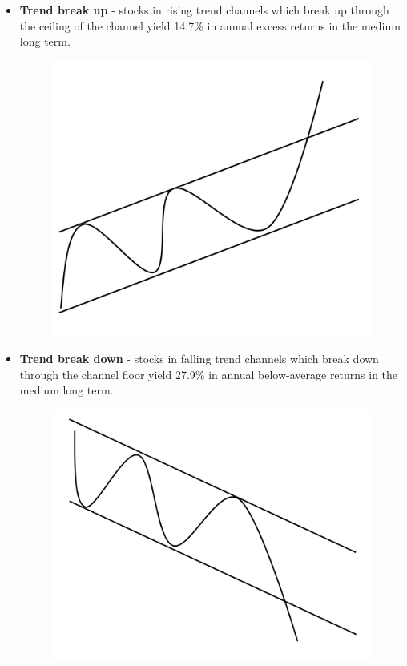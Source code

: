 \begin{itemize}
  \item \textbf{Trend break up} - stocks in rising trend channels which break up through the ceiling of the channel yield 14.7\% in annual excess returns in the medium long term.
\begin{figure}[H]
\centering
\includegraphics [scale=0.20,angle=360]{figures/breakup.png}
\label{fig:breakup}
\end{figure}
  \item \textbf{Trend break down} - stocks in falling trend channels which break down through the channel floor yield 27.9\% in annual below-average returns in the medium long term.
\begin{figure}[H]
\centering
\includegraphics [scale=0.20,angle=360]{figures/breakdown.png}

\end{figure}
\end{itemize}

